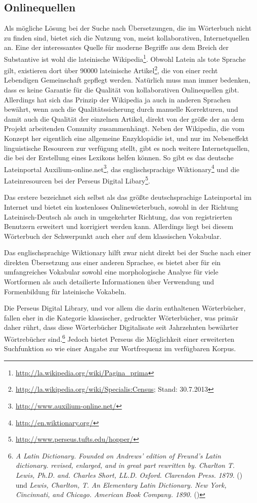 \documentclass[12pt,abstract=on,titlepage,bibliography=totoc,ngerman,listof=totoc]{scrreprt}
\begin{document}
\subsection{Onlinequellen}
\label{subsec:online}
Als mögliche Lösung bei der Suche nach Übersetzungen, die im Wörterbuch nicht zu finden sind, bietet sich die Nutzung von, meist  kollaborativen, Internetquellen an. Eine der interessantes Quelle für moderne Begriffe aus dem Breich der Substantive ist wohl die lateinische Wikipedia\footnote{\url{http://la.wikipedia.org/wiki/Pagina\_prima}}. Obwohl Latein als tote Sprache gilt, existieren dort über 90000 lateinische Artikel\footnote{\url{http://la.wikipedia.org/wiki/Specialis:Census}; Stand: 30.7.2013}, die von einer recht Lebendigen Gemeinschaft gepflegt werden. Natürlich muss man immer bedenken, dass es keine Garantie für die Qualität von kollaborativen Onlinequellen gibt. Allerdings hat sich das Prinzip der Wikipedia ja auch in anderen Sprachen bewährt, wenn auch die Qualitätssicherung durch manuelle Korrekturen, und damit auch die Qualität der einzelnen Artikel, direkt von der größe der an dem Projekt arbeitenden Comunity zusammenhängt. Neben der Wikipedia, die vom Konzept her eigentlich eine allgemeine Enzyklopädie ist, und nur im Nebeneffekt linguistische Resourcen zur verfügung stellt, gibt es noch weitere Internetquellen, die bei der Erstellung eines Lexikons helfen können. So gibt es das deutsche Lateinportal Auxilium-online.net\footnote{\url{http://www.auxilium-online.net/}}, das englischsprachige Wiktionary\footnote{\url{http://en.wiktionary.org/}} und die Lateinresourcen bei der Perseus Digital Libary\footnote{\url{http://www.perseus.tufts.edu/hopper/}}. \par
Das erstere bezeichnet sich selbst als das größte deutschsprachige Lateinportal im Internet und bietet ein kostenloses Onlinewörterbuch, sowohl in der Richtung Lateinisch-Deutsch als auch in umgekehrter Richtung, das von registrierten Benutzern erweitert und korrigiert werden kann. Allerdings liegt bei diesem Wörterbuch der Schwerpunkt auch eher auf dem klassischen Vokabular. \par
Das englischsprachige Wiktionary hilft zwar nicht direkt bei der Suche nach einer direkten Übersetzung aus einer anderen Sprachee, es bietet aber für ein umfangreiches Vokabular sowohl eine morphologische Analyse für viele Wortformen als auch detailierte Informationen über Verwendung und Formenbildung für lateinische Vokabeln. \par
Die Perseus Digital Library, und vor allem die darin enthaltenen Wörterbücher, fallen eher in die Kategorie klassischer, gedruckter Wörterbücher, was primär daher rührt, dass diese Wörterbücher Digitalisate seit Jahrzehnten bewährter Wörtrebücher sind.\footnote{\textit{A Latin Dictionary. Founded on Andrews' edition of Freund's Latin dictionary. revised, enlarged, and in great part rewritten by. Charlton T. Lewis, Ph.D. and. Charles Short, LL.D. Oxford. Clarendon Press. 1879.} (\persalatin) und \textit{Lewis, Charlton, T. An Elementary Latin Dictionary. New York, Cincinnati, and Chicago. American Book Company. 1890.} (\perselemlat)} Jedoch bietet Perseus die Möglichkeit einer erweiterten Suchfunktion so wie einer Angabe zur Wortfrequenz im verfügbaren Korpus. \par
\end{document}
